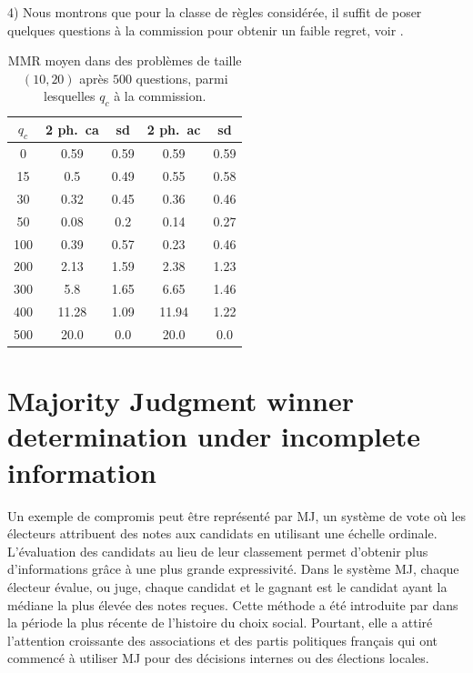 	
	4) Nous montrons que pour la classe de règles considérée, il suffit de poser quelques questions à la commission pour obtenir un faible regret, voir .
		\begin{table}
			\centering
			\captionsetup{type=table}
			\caption{MMR moyen dans des problèmes de taille $(10, 20)$ après $500$ questions, parmi lesquelles $q_c$ à la commission.}
			\label{tab:twoP500French}
			\begin{tabular}{S[table-figures-integer=3, table-figures-decimal=0]S[table-number-alignment = right]@{ ± }S[table-number-alignment = left, table-figures-integer=1]S[table-number-alignment = right]@{ ± }S[table-number-alignment = left, table-figures-integer=1]}
				\toprule
				{$q_c$} & {2 ph.\ ca} & {sd} & {2 ph.\ ac} & {sd} \\
				\midrule		
				
				0	&	0.59	&	0.59	&	0.59	&	0.59	\\
				15	&	0.5		&	0.49	&	0.55	&	0.58	\\
				30	&	0.32	&	0.45	&	0.36	&	0.46	\\
				50	&	0.08	&	0.2 	&	0.14	&	0.27	\\
				100	&	0.39	&	0.57	&	0.23	&	0.46	\\
				200	&	2.13	&	1.59	&	2.38	&	1.23	\\
				300	&	5.8 	&	1.65	&	6.65	&	1.46	\\
				400	&	11.28	&	1.09	&	11.94	&	1.22	\\
				500	&	20.0	&	0.0	&	20.0	&	0.0	\\
				
				\bottomrule
			\end{tabular}
		\end{table}
	


\section{Majority Judgment winner determination under incomplete information}
	Un exemple de compromis peut être représenté par \acl{MJ}, un système de vote où les électeurs attribuent des notes aux candidats en utilisant une échelle ordinale. L'évaluation des candidats au lieu de leur classement permet d'obtenir plus d'informations grâce à une plus grande expressivité.
	Dans le système \ac{MJ}, chaque électeur évalue, ou juge, chaque candidat et le gagnant est le candidat ayant la médiane la plus élevée des notes reçues. 
	Cette méthode a été introduite par \citet{Balinski2007} dans la période la plus récente de l'histoire du choix social. Pourtant, elle a attiré l'attention croissante des associations et des partis politiques français qui ont commencé à utiliser \ac{MJ} pour des décisions internes ou des élections locales. 
	
